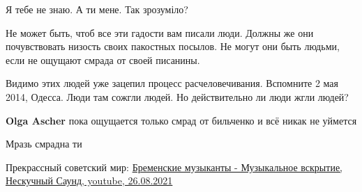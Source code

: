 \begin{itemize}
\begin{itemize}
Я тебе не знаю.
А ти мене.
Так зрозуміло?
\end{itemize}

 

Не может быть, чтоб все эти гадости вам писали люди. Должны же они
почувствовать низость своих пакостных посылов. Не могут они быть людьми, если
не ощущают смрада от своей писанины.

\begin{itemize}
 
Видимо этих людей уже зацепил процесс расчеловечивания.
Вспомните 2 мая 2014, Одесса. Люди там сожгли людей.
Но действительно ли люди жгли людей?

 
\textbf{Olga Ascher} пока ощущается только смрад от бильченко и всё никак не уймется

 
Мразь смрадна ти
\end{itemize}

 
Прекрассный советский мир:
\href{https://youtu.be/-lpwR8pTsL4}{%
Бременские музыканты - Музыкальное вскрытие, Нескучный Саунд, %
youtube, 26.08.2021%
}

 


\end{itemize}
